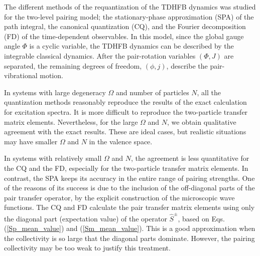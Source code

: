 \documentclass[%
superscriptaddress,
preprint,
showpacs,
nofootinbib,
amsmath,amssymb,
aps,
prc,
floatfix ]%
{revtex4-1}
\begin{document}
The different methods of the requantization of the TDHFB dynamics
was studied for the two-level pairing model;
the stationary-phase approximation (SPA) of the path integral,
the canonical quantization (CQ), and the Fourier decomposition (FD)
of the time-dependent observables.
In this model, since the global gauge angle $\Phi$ is a cyclic variable,
the TDHFB dynamics can be described by the integrable classical dynamics.
After the pair-rotation variables $(\Phi,J)$ are separated,
the remaining degrees of freedom, $(\phi,j)$, describe
the pair-vibrational motion.

In systems with large degeneracy $\Omega$ and number of particles $N$,
all the quantization methods reasonably reproduce the results of the
exact calculation for excitation spectra.
It is more difficult to reproduce the two-particle transfer matrix elements.
Nevertheless, for the large $\Omega$ and $N$,
we obtain qualitative agreement with the exact results.
These are ideal cases,
but realistic situations may have smaller $\Omega$ and $N$
in the valence space.

In systems with relatively small $\Omega$ and $N$,
the agreement is less quantitative for the CQ and the FD,
especially for the two-particle transfer matrix elements.
In contrast, the SPA keeps its accuracy in the entire range of
pairing strengths.
One of the reasons of its success is due to the inclusion of the off-diagonal 
parts of the pair transfer operator,
by the explicit construction of the microscopic wave functions.
The CQ and FD calculate the pair transfer matrix elements using only
the diagonal part (expectation value) of the operator $\hat{S}^\pm$,
based on Eqs. (\ref{Sp_mean_value}) and (\ref{Sm_mean_value}).
This is a good approximation when the collectivity is so large that the
diagonal parts dominate.
However, the pairing collectivity may be too weak to justify this
treatment.

\end{document}
